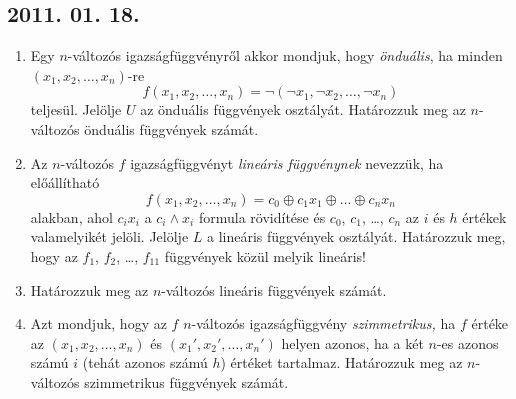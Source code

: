 \documentclass{article}
\begin{document}
\subsection*{2011. 01. 18.}
\begin{enumerate}
\item Egy $n$-változós igazságfüggvényről akkor mondjuk, hogy \emph{önduális}, ha minden $\left(x_1, x_2, \ldots, x_n\right)$-re
\[f\left(x_1, x_2, \ldots, x_n\right)=\neg \left(\neg x_1, \neg x_2, \ldots, \neg x_n\right)\]
teljesül. Jelölje $U$ az önduális függvények osztályát. Határozzuk meg az $n$-változós önduális függvények számát.
\item Az $n$-változós $f$ igazságfüggvényt \emph{lineáris függvénynek} nevezzük, ha előállítható
\[f\left(x_1, x_2, \ldots, x_n\right)=c_0\oplus c_1x_1\oplus\ldots\oplus c_n x_n\]
alakban, ahol $c_i x_i$ a $c_i\land x_i$ formula rövidítése és $c_0$, $c_1$, \ldots, $c_n$ az $i$ és $h$ értékek valamelyikét jelöli. Jelölje $L$ a lineáris függvények osztályát. Határozzuk meg, hogy az $f_1$, $f_2$, \ldots, $f_{11}$ függvények közül melyik lineáris!
\item Határozzuk meg az $n$-változós lineáris függvények számát.
\item Azt mondjuk, hogy az $f$ $n$-változós igazságfüggvény \emph{szimmetrikus,} ha $f$ értéke az $\left(x_1, x_2, \ldots, x_n\right)$ és $\left(x_1', x_2', \ldots, x_n'\right)$ helyen azonos, ha a két $n$-es azonos számú $i$ (tehát azonos számú $h$) értéket tartalmaz. Határozzuk meg az $n$-változós szimmetrikus függvények számát.
\end{enumerate}
\end{document}

